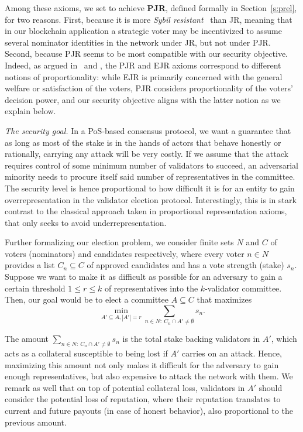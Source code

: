 Among these axioms, we set to achieve \textbf{PJR}, defined formally in Section~\ref{s:prel}, for two reasons. 
First, because it is more \emph{Sybil resistant}~\cite{douceur2002sybil} than JR, meaning that in our blockchain application a strategic voter may be incentivized to assume several nominator identities in the network under JR, but not under PJR. 
Second, because PJR seems to be most compatible with our security objective. Indeed, as argued in~\cite{peters2019proportionality} and \cite{lackner2020approval}, the PJR and EJR axioms correspond to different notions of proportionality: while EJR is primarily concerned with the general welfare or satisfaction of the voters, PJR considers proportionality of the voters' decision power, and our security objective aligns with the latter notion as we explain below.

\emph{The security goal.} 
In a PoS-based consensus protocol, we want a guarantee that as long as most of the stake is in the hands of actors that behave honestly or rationally, carrying any attack will be very costly. If we assume that the attack requires control of some minimum number of validators to succeed, an adversarial minority needs to procure itself said number of representatives in the committee. The security level is hence proportional to how difficult it is for an entity to gain overrepresentation in the validator election protocol. Interestingly, this is in stark contrast to the classical approach taken in proportional representation axioms, that only seeks to avoid underrepresentation. 

Further formalizing our election problem, we consider finite sets $N$ and $C$ of voters (nominators) and candidates respectively, where every voter $n\in N$ provides a list $C_n\subseteq C$ of approved candidates and has a vote strength (stake) $s_n$. 
Suppose we want to make it as difficult as possible for an adversary to gain a certain threshold $1\leq r\leq k$ of representatives into the $k$-validator committee. 
Then, our goal would be to elect a committee $A\subseteq C$ that maximizes 
$$\min_{A'\subseteq A, |A'|=r} \sum_{n\in N: \ C_n\cap A'\neq \emptyset} s_n.$$ 

The amount $\sum_{n\in N: \ C_n\cap A'\neq \emptyset} s_n$ is the total stake backing validators in $A'$, which acts as a collateral susceptible to being lost if $A'$ carries on an attack. Hence, maximizing this amount not only makes it difficult for the adversary to gain enough representatives, but also expensive to attack the network with them. 
We remark as well that on top of potential collateral loss, validators in $A'$ should consider the potential loss of reputation, where their reputation translates to current and future payouts (in case of honest behavior), also proportional to the previous amount. 

